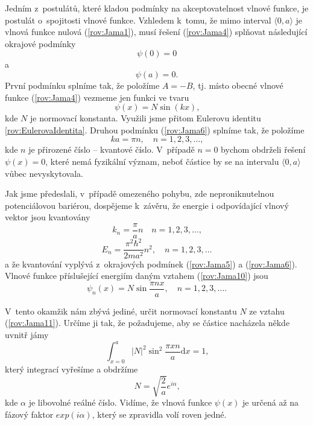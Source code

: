 Jedním z~postulátů, které kladou podmínky na akceptovatelnost vlnové funkce, je postulát o~spojitosti vlnové funkce. Vzhledem k~tomu, že mimo interval $\langle0,a\rangle$ je vlnová funkce nulová (\ref{rov:Jama1}), musí řešení (\ref{rov:Jama4}) splňovat následující okrajové podmínky
\begin{equation}
\psi(0)=0
\label{rov:Jama5}
\end{equation}
a
\begin{equation}
\psi(a)=0 \mbox{.}
\label{rov:Jama6}
\end{equation}
První podmínku splníme tak, že položíme $A = -B$, tj. místo obecné vlnové funkce (\ref{rov:Jama4}) vezmeme jen funkci ve tvaru
\begin{equation}
\psi(x)=N \sin(kx) \mbox{,}
\label{rov:Jama7}
\end{equation}
kde $N$ je normovací konstanta. Využili jsme přitom Eulerovu identitu \eqref{rov:EulerovaIdentita}. Druhou podmínku (\ref{rov:Jama6}) splníme tak, že položíme
\begin{equation}
ka = \pi n, \quad n= 1,2,3, \dots \mbox{,}
\label{rov:Jama8}
\end{equation}
kde $n$ je přirozené číslo -- kvantové číslo. V~případě $n=0$ bychom obdrželi řešení $\psi(x)=0$, které nemá fyzikální význam, neboť částice by se na intervalu $\langle0,a\rangle$ vůbec nevyskytovala.

Jak jsme předeslali, v~případě omezeného pohybu, zde neproniknutelnou potenciálovou bariérou, dospějeme k~závěru, že energie i odpovídající vlnový vektor jsou kvantovány
\begin{equation}
k_n = \frac{\pi}{a}n \quad n=1,2,3, \dots \mbox{,}
\label{rov:Jama9}
\end{equation}
\begin{equation}
\boxed{E_n = \frac{\pi^2\hbar^2}{2ma^2}n^2, \quad n=1,2,3, \dots }
\label{rov:Jama10}
\end{equation}
a že kvantování vyplývá z~okrajových podmínek (\ref{rov:Jama5}) a (\ref{rov:Jama6}). Vlnové funkce příslušející energiím daným vztahem (\ref{rov:Jama10}) jsou
\begin{equation}
\boxed{\psi_n(x) = N \sin \frac{\pi n x}{a}, \quad n=1,2,3,\dots \mbox{.}}
\label{rov:Jama11}
\end{equation}

V~tento okamžik nám zbývá jediné, určit normovací konstantu $N$ ze vztahu (\ref{rov:Jama11}). Určíme ji tak, že požadujeme, aby se částice nacházela někde uvnitř jámy
\begin{equation}
\int_{x=0}^a |N|^2 \sin^2 \frac{\pi x n}{a} \mathrm{d}x = 1 \mbox{,}
\label{rov:Jama12}
\end{equation}
který integrací vyřešíme a obdržíme
\begin{equation}
N = \sqrt{\frac{2}{a}}e^{i\alpha} \mbox{,}
\label{rov:Jama13}
\end{equation}
kde $\alpha$ je libovolné reálné číslo. Vidíme, že vlnová funkce $\psi(x)$ je určená až na fázový faktor $exp(i\alpha)$, který se zpravidla volí roven jedné.

